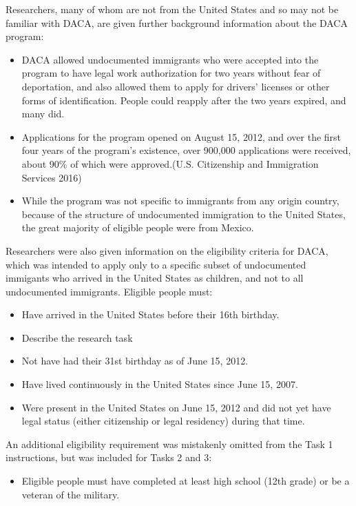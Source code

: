 \documentclass[
  letterpaper,
  DIV=11,
  numbers=noendperiod]{scrartcl}
\providecommand{\tightlist}{%
  \setlength{\itemsep}{0pt}\setlength{\parskip}{0pt}}\usepackage{longtable,booktabs,array}
\begin{document}
Researchers, many of whom are not from the United States and so may not
be familiar with DACA, are given further background information about
the DACA program:

\begin{itemize}
\item
  DACA allowed undocumented immigrants who were accepted into the
  program to have legal work authorization for two years without fear of
  deportation, and also allowed them to apply for drivers' licenses or
  other forms of identification. People could reapply after the two
  years expired, and many did.
\item
  Applications for the program opened on August 15, 2012, and over the
  first four years of the program's existence, over 900,000 applications
  were received, about 90\% of which were approved.(U.S. Citizenship and
  Immigration Services 2016)
\item
  While the program was not specific to immigrants from any origin
  country, because of the structure of undocumented immigration to the
  United States, the great majority of eligible people were from Mexico.
\end{itemize}

Researchers were also given information on the eligibility criteria for
DACA, which was intended to apply only to a specific subset of
undocumented immigants who arrived in the United States as children, and
not to all undocumented immigrants. Eligible people must:

\begin{itemize}
\item
  Have arrived in the United States before their 16th birthday.
\item
  Describe the research task
\item
  Not have had their 31st birthday as of June 15, 2012.
\item
  Have lived continuously in the United States since June 15, 2007.
\item
  Were present in the United States on June 15, 2012 and did not yet
  have legal status (either citizenship or legal residency) during that
  time.
\end{itemize}

An additional eligibility requirement was mistakenly omitted from the
Task 1 instructions, but was included for Tasks 2 and 3:

\begin{itemize}
\tightlist
\item
  Eligible people must have completed at least high school (12th grade)
  or be a veteran of the military.
\end{itemize}
\end{document}
